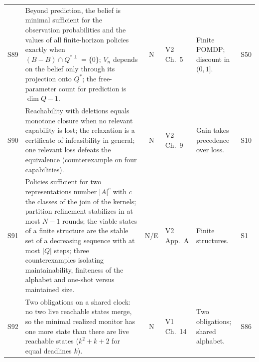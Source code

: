 \documentclass[10pt]{article}
\begin{document}
\begin{longtable}{@{}l p{} c l p{} p{}@{}}
S89 & Beyond prediction, the belief is minimal sufficient for the observation probabilities and the values of all finite-horizon policies exactly when $(B-B)\cap Q^{*\perp}=\{0\}$; $V_n$ depends on the belief only through its projection onto $Q^{*}$; the free-parameter count for prediction is $\dim Q-1$. & N & V2 Ch.~5 & Finite POMDP; discount in $(0,1]$. & S50\\[3pt]
S90 & Reachability with deletions equals monotone closure when no relevant capability is lost; the relaxation is a certificate of infeasibility in general; one relevant loss defeats the equivalence (counterexample on four capabilities). & N & V2 Ch.~9 & Gain takes precedence over loss. & S10\\[3pt]
S91 & Policies sufficient for two representations number $|A|^c$ with $c$ the classes of the join of the kernels; partition refinement stabilizes in at most $N-1$ rounds; the viable states of a finite structure are the stable set of a decreasing sequence with at most $|Q|$ steps; three counterexamples isolating maintainability, finiteness of the alphabet and one-shot versus maintained size. & N/E & V2 App.~A & Finite structures. & S1\\[3pt]
S92 & Two obligations on a shared clock: no two live reachable states merge, so the minimal realized monitor has one more state than there are live reachable states ($k^2+k+2$ for equal deadlines $k$). & N & V1 Ch.~14 & Two obligations; shared alphabet. & S86\\[3pt]
\bottomrule
\end{longtable}
\end{document}
